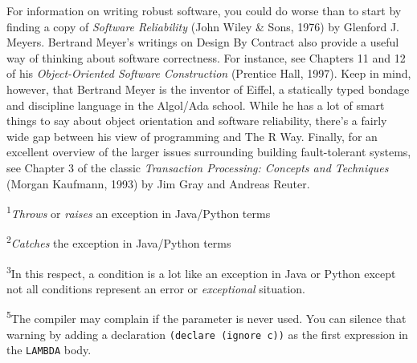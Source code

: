 For information on writing robust software, you could do worse than to
start by finding a copy of \emph{Software Reliability} (John Wiley \&
Sons, 1976) by Glenford J. Meyers. Bertrand Meyer's writings on Design
By Contract also provide a useful way of thinking about software
correctness. For instance, see Chapters 11 and 12 of his
\emph{Object-Oriented Software Construction} (Prentice Hall, 1997). Keep
in mind, however, that Bertrand Meyer is the inventor of Eiffel, a
statically typed bondage and discipline language in the Algol/Ada
school. While he has a lot of smart things to say about object
orientation and software reliability, there's a fairly wide gap between
his view of programming and The R Way. Finally, for an excellent
overview of the larger issues surrounding building fault-tolerant
systems, see Chapter 3 of the classic \emph{Transaction Processing:
Concepts and Techniques} (Morgan Kaufmann, 1993) by Jim Gray and Andreas
Reuter.

\textsuperscript{1}\emph{Throws} or \emph{raises} an exception in
Java/Python terms

\textsuperscript{2}\emph{Catches} the exception in Java/Python terms

\textsuperscript{3}In this respect, a condition is a lot like an
exception in Java or Python except not all conditions represent an error
or \emph{exceptional} situation.

\textsuperscript{5}The compiler may complain if the parameter is never
used. You can silence that warning by adding a declaration
\texttt{(declare (ignore c))} as the first expression in the
\texttt{LAMBDA} body.
